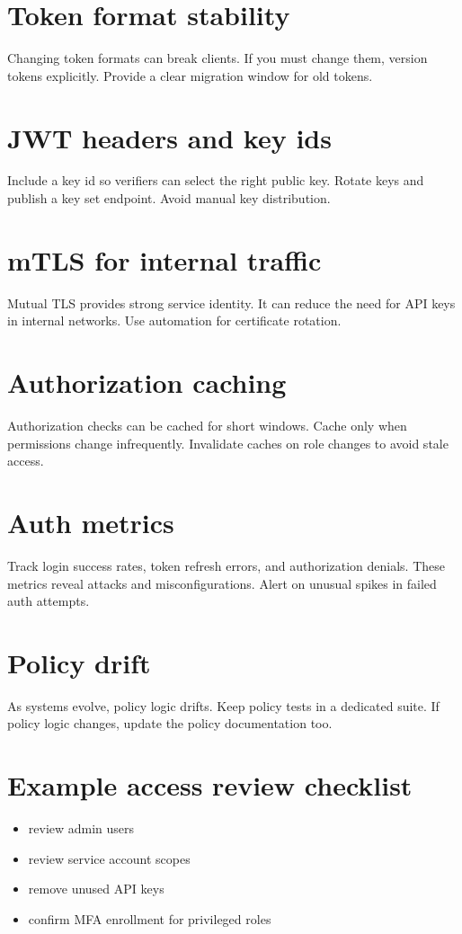 \section{Token format stability}
Changing token formats can break clients.
If you must change them, version tokens explicitly.
Provide a clear migration window for old tokens.

\section{JWT headers and key ids}
Include a key id so verifiers can select the right public key.
Rotate keys and publish a key set endpoint.
Avoid manual key distribution.

\section{mTLS for internal traffic}
Mutual TLS provides strong service identity.
It can reduce the need for API keys in internal networks.
Use automation for certificate rotation.

\section{Authorization caching}
Authorization checks can be cached for short windows.
Cache only when permissions change infrequently.
Invalidate caches on role changes to avoid stale access.

\section{Auth metrics}
Track login success rates, token refresh errors, and authorization denials.
These metrics reveal attacks and misconfigurations.
Alert on unusual spikes in failed auth attempts.

\section{Policy drift}
As systems evolve, policy logic drifts.
Keep policy tests in a dedicated suite.
If policy logic changes, update the policy documentation too.

\section{Example access review checklist}
\begin{itemize}[nosep]
  \item review admin users
  \item review service account scopes
  \item remove unused API keys
  \item confirm MFA enrollment for privileged roles
\end{itemize}

